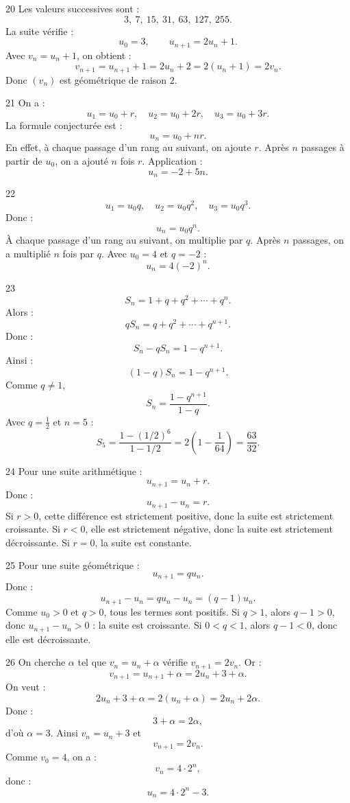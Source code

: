 \documentclass[11pt,a4paper]{article}
\begin{document}
\begin{solbox}{20}
Les valeurs successives sont :
\[
3,\ 7,\ 15,\ 31,\ 63,\ 127,\ 255.
\]
La suite vérifie :
\[
u_0=3,\qquad u_{n+1}=2u_n+1.
\]
Avec \(v_n=u_n+1\), on obtient :
\[
v_{n+1}=u_{n+1}+1=2u_n+2=2(u_n+1)=2v_n.
\]
Donc \((v_n)\) est géométrique de raison \(2\).
\end{solbox}

\begin{solbox}{21}
On a :
\[
u_1=u_0+r,\quad u_2=u_0+2r,\quad u_3=u_0+3r.
\]
La formule conjecturée est :
\[
u_n=u_0+nr.
\]
En effet, à chaque passage d'un rang au suivant, on ajoute \(r\). Après \(n\) passages à partir de \(u_0\), on a ajouté \(n\) fois \(r\).  
Application :
\[
u_n=-2+5n.
\]
\end{solbox}

\begin{solbox}{22}
\[
u_1=u_0q,\quad u_2=u_0q^2,\quad u_3=u_0q^3.
\]
Donc :
\[
u_n=u_0q^n.
\]
À chaque passage d'un rang au suivant, on multiplie par \(q\). Après \(n\) passages, on a multiplié \(n\) fois par \(q\).  
Avec \(u_0=4\) et \(q=-2\) :
\[
u_n=4(-2)^n.
\]
\end{solbox}

\begin{solbox}{23}
\[
S_n=1+q+q^2+\cdots+q^n.
\]
Alors :
\[
qS_n=q+q^2+\cdots+q^{n+1}.
\]
Donc :
\[
S_n-qS_n=1-q^{n+1}.
\]
Ainsi :
\[
(1-q)S_n=1-q^{n+1}.
\]
Comme \(q\neq1\),
\[
S_n=\frac{1-q^{n+1}}{1-q}.
\]
Avec \(q=\frac12\) et \(n=5\) :
\[
S_5=\frac{1-(1/2)^6}{1-1/2}=2\left(1-\frac1{64}\right)=\frac{63}{32}.
\]
\end{solbox}

\begin{solbox}{24}
Pour une suite arithmétique :
\[
u_{n+1}=u_n+r.
\]
Donc :
\[
u_{n+1}-u_n=r.
\]
Si \(r>0\), cette différence est strictement positive, donc la suite est strictement croissante.  
Si \(r<0\), elle est strictement négative, donc la suite est strictement décroissante.  
Si \(r=0\), la suite est constante.
\end{solbox}

\begin{solbox}{25}
Pour une suite géométrique :
\[
u_{n+1}=qu_n.
\]
Donc :
\[
u_{n+1}-u_n=qu_n-u_n=(q-1)u_n.
\]
Comme \(u_0>0\) et \(q>0\), tous les termes sont positifs.  
Si \(q>1\), alors \(q-1>0\), donc \(u_{n+1}-u_n>0\) : la suite est croissante.  
Si \(0<q<1\), alors \(q-1<0\), donc elle est décroissante.
\end{solbox}

\begin{solbox}{26}
On cherche \(\alpha\) tel que \(v_n=u_n+\alpha\) vérifie \(v_{n+1}=2v_n\).  
Or :
\[
v_{n+1}=u_{n+1}+\alpha=2u_n+3+\alpha.
\]
On veut :
\[
2u_n+3+\alpha=2(u_n+\alpha)=2u_n+2\alpha.
\]
Donc :
\[
3+\alpha=2\alpha,
\]
d'où \(\alpha=3\).  
Ainsi \(v_n=u_n+3\) et
\[
v_{n+1}=2v_n.
\]
Comme \(v_0=4\), on a :
\[
v_n=4\cdot2^n,
\]
donc :
\[
u_n=4\cdot2^n-3.
\]
\end{solbox}
\end{document}
